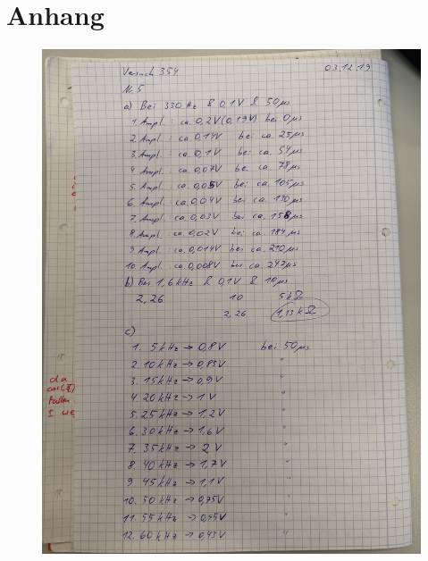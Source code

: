 \section{Anhang}
\newpage

\begin{figure}
    \centering
    \includegraphics[scale = 0.25]{content/Orginaldaten1.jpg}
\end{figure}

